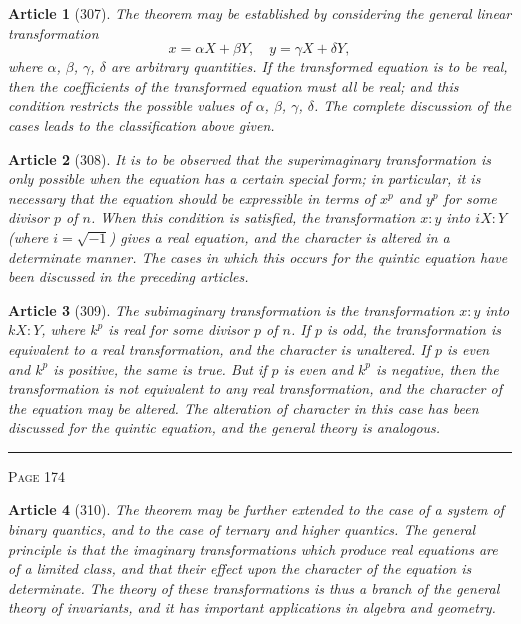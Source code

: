 \documentclass[11pt,a4paper]{article}
\theoremstyle{cayley}
\newtheorem{art}{Article}
\begin{document}
\begin{art}[307]
The theorem may be established by considering the general linear transformation
\[
x = \alpha X + \beta Y, \quad y = \gamma X + \delta Y,
\]
where $\alpha$, $\beta$, $\gamma$, $\delta$ are arbitrary quantities. If the transformed equation is to be real, then the coefficients of the transformed equation must all be real; and this condition restricts the possible values of $\alpha$, $\beta$, $\gamma$, $\delta$. The complete discussion of the cases leads to the classification above given.
\end{art}

\begin{art}[308]
It is to be observed that the superimaginary transformation is only possible when the equation has a certain special form; in particular, it is necessary that the equation should be expressible in terms of $x^p$ and $y^p$ for some divisor $p$ of $n$. When this condition is satisfied, the transformation $x:y$ into $iX:Y$ (where $i = \sqrt{-1}$) gives a real equation, and the character is altered in a determinate manner. The cases in which this occurs for the quintic equation have been discussed in the preceding articles.
\end{art}

\begin{art}[309]
The subimaginary transformation is the transformation $x:y$ into $kX:Y$, where $k^p$ is real for some divisor $p$ of $n$. If $p$ is odd, the transformation is equivalent to a real transformation, and the character is unaltered. If $p$ is even and $k^p$ is positive, the same is true. But if $p$ is even and $k^p$ is negative, then the transformation is not equivalent to any real transformation, and the character of the equation may be altered. The alteration of character in this case has been discussed for the quintic equation, and the general theory is analogous.
\end{art}

\vspace{1em}
\noindent\rule{\textwidth}{0.4pt}
\begin{center}\textsc{Page 174}\end{center}
\newpage

\begin{art}[310]
The theorem may be further extended to the case of a system of binary quantics, and to the case of ternary and higher quantics. The general principle is that the imaginary transformations which produce real equations are of a limited class, and that their effect upon the character of the equation is determinate. The theory of these transformations is thus a branch of the general theory of invariants, and it has important applications in algebra and geometry.
\end{art}
\end{document}

